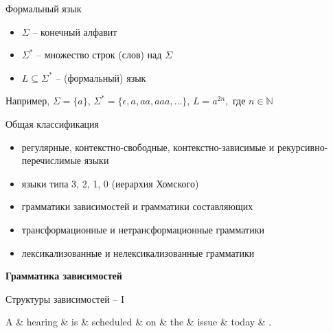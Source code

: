 \documentclass{beamer}
\begin{document}
\begin{frame}{Формальный язык}
\begin{itemize}
	\item $\Sigma$ -- конечный алфавит
	\item $\Sigma^{*}$ -- множество строк (слов) над $\Sigma$
	\item $L \subseteq \Sigma^{*}$ -- (формальный) язык
\end{itemize}
\bigskip
Например, $\Sigma = \{a\}$, $\Sigma^{*} = \{\epsilon, a, aa, aaa, \ldots\}$, $L = a^{2n},$ где $n \in \mathbb{N}$
\end{frame}

\begin{frame}{Общая классификация}
\begin{itemize}
	\item регулярные, контекстно-свободные, контекстно-зависимые и рекурсивно-перечислимые языки
    \item языки типа 3, 2, 1, 0 (иерархия Хомского)
\end{itemize}
\bigskip
\begin{itemize}
    \item грамматики зависимостей и грамматики составляющих
    \item трансформационные и нетрансформационные грамматики
    \item лексикализованные и нелексикализованные грамматики
\end{itemize}
\end{frame}

\begin{frame}{}
\begin{center}
	\textbf{Грамматика зависимостей}
\end{center}
\end{frame}

\begin{frame}{Структуры зависимостей -- I}
\begin{dependency}[theme = simple]
   \begin{deptext}[column sep=1em]
      A \& hearing \& is \& scheduled \& on \& the \& issue \& today \& . \\
   \end{deptext}
\end{dependency}
\end{frame}
\end{document}
